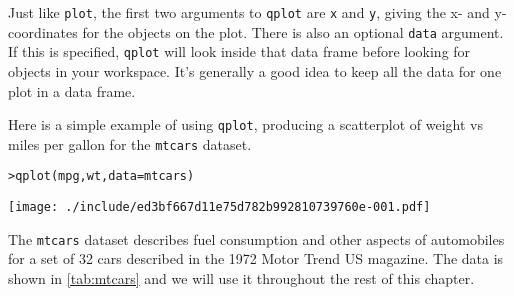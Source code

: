 Just like {\tt plot}, the first two arguments to {\tt qplot} are {\tt x} and {\tt y}, giving the x- and y-coordinates for the objects on the plot. There is also an optional {\tt data} argument.  If this is specified, {\tt qplot} will look inside that data frame before looking for objects in your workspace.  It's generally a good idea to keep all the data for one plot in a data frame.  

Here is a  simple example of using {\tt qplot}, producing a scatterplot of weight vs miles per gallon for the {\tt mtcars} dataset.  

\begin{alltt}
> qplot(mpg, wt, data = mtcars)
\end{alltt}
\texttt{[image: ./include/ed3bf667d11e75d782b992810739760e-001.pdf]}
\begin{alltt}

\end{alltt}

The {\tt mtcars} dataset describes fuel consumption and other aspects of automobiles for a set of 32 cars described in the 1972 Motor Trend US magazine.  The data is shown in \ref{tab:mtcars} and we will use it throughout the rest of this chapter.

